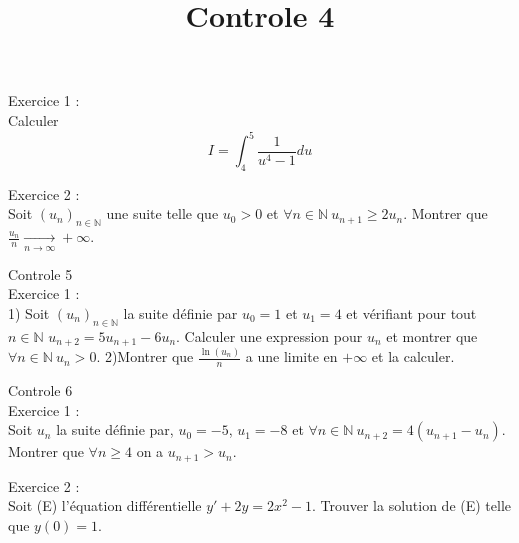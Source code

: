 \documentclass{article}
\begin{document}
\title{Controle 4}
\maketitle
\renewcommand{\labelitemi}{$\circ$}

\Large{Exercice 1} :\\
Calculer 
$$I = \int_4^5 \frac{1}{u^4-1} du$$

\vspace{8mm}

\Large{Exercice 2} : \\
Soit $(u_n)_{n\in \mathbb{N}}$ une suite telle que $u_0>0$ et $\forall
n \in \mathbb{N} \ u_{n+1} \geq 2 u_n$. Montrer que $\frac{u_n}{n} \xrightarrow[n
\to \infty]{} +  \infty$.

\vspace{15mm}

Controle 5 \\
\Large{Exercice 1} : \\
1) Soit $(u_n)_{n \in \mathbb{N} }$ la suite d{\'e}finie par $u_0=1$ et
$u_1=4$ et v{\'e}rifiant pour tout $n \in \mathbb{N}$
$u_{n+2}=5u_{n+1}-6u_n$. Calculer une expression pour $u_n$ et montrer
que $\forall n\in \mathbb{N} \ u_n>0$.
\vspace{8mm}
2)Montrer que $\frac{\ln (u_n)}{n}$ a une limite en $+ \infty$ et la
calculer.


\vspace{15mm}
Controle 6\\
\Large{Exercice 1} : \\
Soit $u_n$ la suite d{\'e}finie par, $u_0=-5$, $u_1=-8$ et $\forall n\in
\mathbb{N} \ u_{n+2} = 4(u_{n+1}-u_n)$. Montrer que $\forall n\geq 4$
on a  $u_{n+1}>u_n$.
\vspace{8mm}
 
\Large{Exercice 2 } : \\
Soit (E) l'{\'e}quation diff{\'e}rentielle $y'+2y=2x^2-1$. Trouver la solution
de (E) telle que $y(0)=1$.







\end{document}
